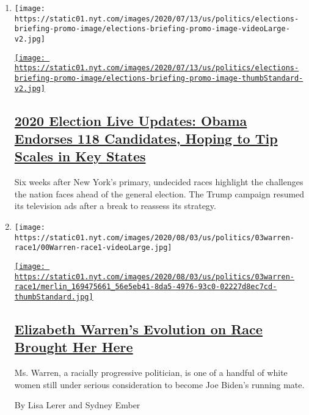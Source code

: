 \begin{enumerate}
\def\labelenumi{\arabic{enumi}.}
\item
  \texttt{[image: https://static01.nyt.com/images/2020/07/13/us/politics/elections-briefing-promo-image/elections-briefing-promo-image-videoLarge-v2.jpg]}

  \href{/2020/08/03/us/elections/biden-vs-trump.html}{\texttt{[image: https://static01.nyt.com/images/2020/07/13/us/politics/elections-briefing-promo-image/elections-briefing-promo-image-thumbStandard-v2.jpg]}}

  \hypertarget{2020-election-live-updates-obama-endorses-118-candidates-hoping-to-tip-scales-in-key-states}{%
  \subsection{\texorpdfstring{\href{/2020/08/03/us/elections/biden-vs-trump.html}{2020
  Election Live Updates: Obama Endorses 118 Candidates, Hoping to Tip
  Scales in Key
  States}}{2020 Election Live Updates: Obama Endorses 118 Candidates, Hoping to Tip Scales in Key States}}\label{2020-election-live-updates-obama-endorses-118-candidates-hoping-to-tip-scales-in-key-states}}

  Six weeks after New York's primary, undecided races highlight the
  challenges the nation faces ahead of the general election. The Trump
  campaign resumed its television ads after a break to reassess its
  strategy.
\item
  \texttt{[image: https://static01.nyt.com/images/2020/08/03/us/politics/03warren-race1/00Warren-race1-videoLarge.jpg]}

  \href{/2020/08/02/us/politics/elizabeth-warren-biden-vice-president.html}{\texttt{[image: https://static01.nyt.com/images/2020/08/03/us/politics/03warren-race1/merlin\_169475661\_56e5eb41-8da5-4976-93c0-02227d8ec7cd-thumbStandard.jpg]}}

  \hypertarget{elizabeth-warrens-evolution-on-race-brought-her-here}{%
  \subsection{\texorpdfstring{\href{/2020/08/02/us/politics/elizabeth-warren-biden-vice-president.html}{Elizabeth
  Warren's Evolution on Race Brought Her
  Here}}{Elizabeth Warren's Evolution on Race Brought Her Here}}\label{elizabeth-warrens-evolution-on-race-brought-her-here}}

  Ms. Warren, a racially progressive politician, is one of a handful of
  white women still under serious consideration to become Joe Biden's
  running mate.

  By Lisa Lerer and Sydney Ember
\end{enumerate}

